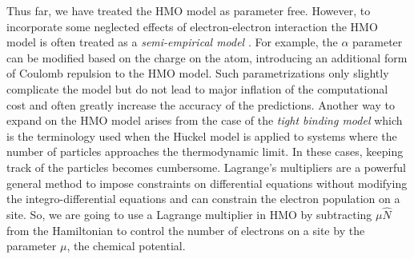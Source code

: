\documentclass[twoside,twocolumn,9pt]{article}
\begin{document}
Thus far, we have treated the HMO model as parameter free. However, to incorporate some neglected effects of electron-electron interaction the HMO model is often treated as a \emph{semi-empirical model} \cite{Pow}. For example, the $\alpha$ parameter can be modified based on the charge on the atom, introducing an additional form of Coulomb repulsion to the HMO model. Such parametrizations only slightly complicate the model but do not lead to major inflation of the computational cost and often greatly increase the accuracy of the predictions. Another way to expand on the HMO model arises from the case of the \emph{tight binding model} which is the terminology used when the H$\ddot{\text{u}}$ckel model is applied to systems where the number of particles approaches the thermodynamic limit. In these cases, keeping track of the particles becomes cumbersome. Lagrange's multipliers \cite{arfken1995mathematical}  are a powerful general method to impose constraints on differential equations without modifying the integro-differential equations and can constrain the electron population on a site. So, we are going to use a Lagrange multiplier in HMO by subtracting $\mu\hat{N}$ from the Hamiltonian to control the number of electrons on a site by the parameter $\mu$, the chemical potential.

\end{document}
